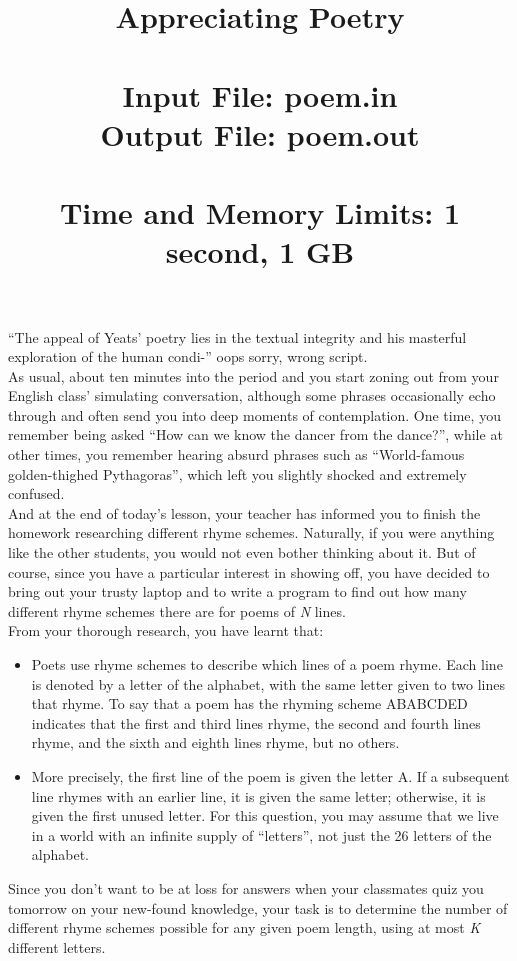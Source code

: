 \documentclass{article}
\title{\vspace{-0.2in}\textbf{Appreciating Poetry} \\
	\ \\
	\large \textbf{Input File:} poem.in \\
	\large \textbf{Output File:} poem.out \\
	\ \\
	\textbf{Time and Memory Limits:} 1 second, 1 GB}
\date{\vspace{-10ex}}
\begin{document}
\maketitle
	
“The appeal of Yeats’ poetry lies in the textual integrity and his masterful exploration of the human condi-” oops sorry, wrong script. \\

As usual, about ten minutes into the period and you start zoning out from your English class’ simulating conversation, although some phrases occasionally echo through and often send you into deep moments of contemplation. One time, you remember being asked “How can we know the dancer from the dance?”, while at other times, you remember hearing absurd phrases such as “World-famous golden-thighed Pythagoras”, which left you slightly shocked and extremely confused. \\

And at the end of today’s lesson, your teacher has informed you to finish the homework researching different rhyme schemes. Naturally, if you were anything like the other students, you would not even bother thinking about it. But of course, since you have a particular interest in showing off, you have decided to bring out your trusty laptop and to write a program to find out how many different rhyme schemes there are for poems of \emph{N} lines. \\

From your thorough research, you have learnt that:
\begin{itemize}
	\item Poets use rhyme schemes to describe which lines of a poem rhyme. Each line is denoted by a letter of the alphabet, with the same letter given to two lines that rhyme. To say that a poem has the rhyming scheme ABABCDED indicates that the first and third lines rhyme, the second and fourth lines rhyme, and the sixth and eighth lines rhyme, but no others. 
	
	\item More precisely, the first line of the poem is given the letter A. If a subsequent line rhymes with an earlier line, it is given the same letter; otherwise, it is given the first unused letter. For this question, you may assume that we live in a world with an infinite supply of “letters”, not just the 26 letters of the alphabet. \\
\end{itemize}

Since you don't want to be at loss for answers when your classmates quiz you tomorrow on your new-found knowledge, your task is to determine the number of different rhyme schemes possible for any given poem length, using at most \emph{K} different letters. \\
\end{document}

